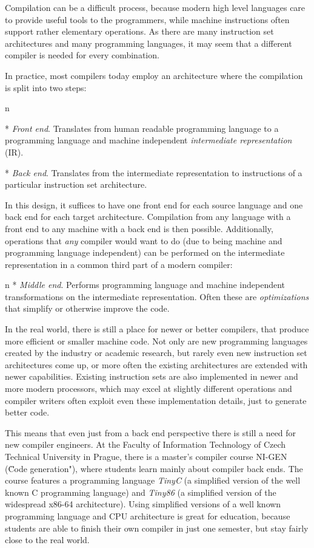 Compilation can be a difficult process, because modern high level languages care to
provide useful tools to the programmers, while machine instructions often
support rather elementary operations. As there are many instruction set
architectures and many programming languages, it may seem that a different
compiler is needed for every combination.

In practice, most compilers today employ an architecture where the compilation
is split into two steps:

\begitems \style n

* {\em Front end}. Translates from human readable programming language to a
programming language and machine independent {\em intermediate representation}
(IR).

* {\em Back end}. Translates from the intermediate representation to instructions of
a particular instruction set architecture.

\enditems
%
In this design, it suffices to have one front end for each source language
and one back end for each target architecture. Compilation from any language
with a front end to any machine with a back end is then possible.
Additionally, operations that {\em any} compiler would want to do (due to being
machine and programming language independent) can be performed on the
intermediate representation in a common third part of a modern compiler:

\begitems \style n 
* {\em Middle end}. Performs programming language and machine independent
transformations on the intermediate representation. Often these are {\em
optimizations} that simplify or otherwise improve the code.
\enditems

In the real world, there is still a place for newer or better compilers, that
produce more efficient or smaller machine code. Not only are new programming
languages created by the industry or academic research, but rarely even new
instruction set architectures come up, or more often the existing architectures are
extended with newer capabilities. Existing instruction sets are also implemented
in newer and more modern processors, which may excel at slightly different
operations and compiler writers often exploit even these implementation
details, just to generate better code.

This means that even just from a back end perspective there is still a need for new
compiler engineers. At the Faculty of Information Technology of Czech Technical
University in Prague, there is a master's compiler course NI-GEN (\"Code
generation"), where students learn mainly about compiler back ends. The course
features a programming language {\em TinyC} (a simplified version of the well
known C programming language) and {\em Tiny86} (a simplified version of the
widespread x86-64 architecture). Using simplified versions of a well known
programming language and CPU architecture is great for education, because
students are able to finish their own compiler in just one semester, but stay
fairly close to the real world.

